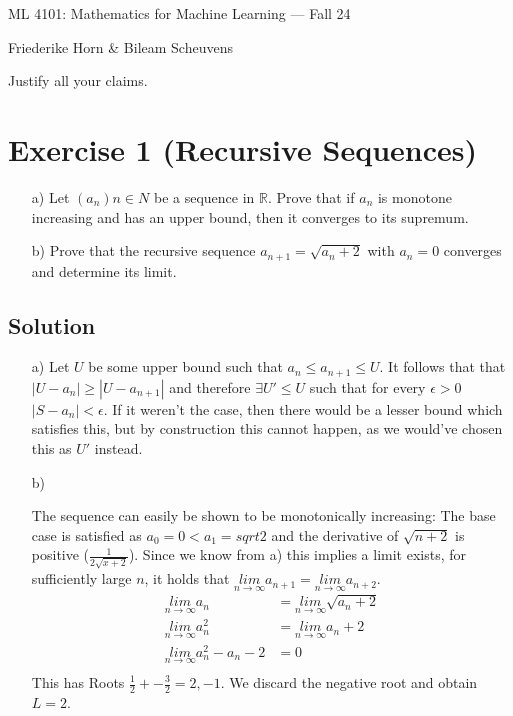 \documentclass[10pt]{article}
\numberwithin{equation}{section}
\newcommand{\limn}{\underset{n\rightarrow \infty}{lim}}
\begin{document}
\begin{center}
    \sc ML 4101: Mathematics for Machine Learning --- Fall 24
\end{center}

\noindent Friederike Horn \& Bileam Scheuvens

Justify all your claims.
\section*{Exercise 1 (Recursive Sequences)}
\begin{enumerate}
\item[a)]{
  Let $(a_n)n\in N$ be a sequence in $\mathbb{R}$. Prove that if $a_n$ is monotone increasing and has an upper bound, then it converges to its supremum.
  }
\item[b)]{
    Prove that the recursive sequence $a_{n+1} = \sqrt{a_n + 2}$ with $a_n = 0$ converges and determine its limit.
  }
\end{enumerate}
\subsection*{Solution}
\begin{enumerate}
\item[a)]{
    Let $U$ be some upper bound such that $a_n \leq a_{n+1} \leq U$.
  It follows that that $|U-a_n| \geq |U - a_{n+1}|$ and therefore $\exists U' \leq U$ such that for every $\epsilon > 0$ $|S-a_n| < \epsilon$. If it weren't the case, then there would be a lesser bound which satisfies this, but by construction this cannot happen, as we would've chosen this as $U'$ instead.
  }
\item[b)]{
    The sequence can easily be shown to be monotonically increasing:
    The base case is satisfied as $a_0 = 0 < a_1 = sqrt{2}$ and the derivative of $\sqrt{n+2}$ is positive ($\frac{1}{2\sqrt{x+2}}$).
    Since we know from a) this implies a limit exists, for sufficiently large $n$, it holds that $\underset{n\rightarrow \infty}{lim} a_{n+1} = \underset{n\rightarrow \infty}{lim} a_{n+2}$.
    \begin{align*}
      \limn a_n &= \limn \sqrt{a_n+2}\\
      \limn a_n^2 &= \limn a_n+2\\
      \limn a_n^2 -a_n -2 &= 0\\
    \end{align*}
    This has Roots $\frac{1}{2} +- \frac{3}{2} = 2, -1$.
    We discard the negative root and obtain $L = 2$.


  }

\end{enumerate}
\end{document}

